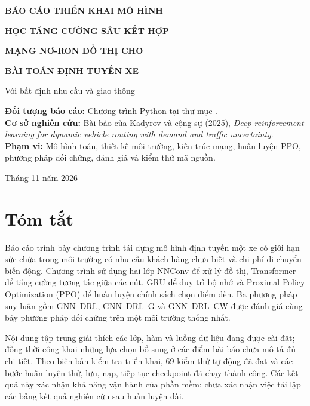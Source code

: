 \documentclass[12pt,a4paper,oneside]{report}
\newcommand{\file}[1]{\texttt{\detokenize{#1}}}
\begin{document}
\begin{titlepage}
\centering
\vspace*{1.5cm}
{\Large\bfseries BÁO CÁO TRIỂN KHAI MÔ HÌNH\par}
\vspace{1.2cm}
{\LARGE\bfseries HỌC TĂNG CƯỜNG SÂU KẾT HỢP\par}
\vspace{0.3cm}
{\LARGE\bfseries MẠNG NƠ-RON ĐỒ THỊ CHO\par}
\vspace{0.3cm}
{\LARGE\bfseries BÀI TOÁN ĐỊNH TUYẾN XE\par}
\vspace{0.6cm}
{\large Với bất định nhu cầu và giao thông\par}
\vspace{1.4cm}
\begin{minipage}{0.9\textwidth}
\textbf{Đối tượng báo cáo:} Chương trình Python tại thư mục
\file{research/cvrp_reproduction}.\\[0.4cm]
\textbf{Cơ sở nghiên cứu:} Bài báo của Kadyrov và cộng sự (2025),
\emph{Deep reinforcement learning for dynamic vehicle routing with demand
and traffic uncertainty}.\\[0.4cm]
\textbf{Phạm vi:} Mô hình toán, thiết kế môi trường, kiến trúc mạng,
huấn luyện PPO, phương pháp đối chứng, đánh giá và kiểm thử mã nguồn.
\end{minipage}
\vfill
{\large Tháng 11 năm 2026\par}
\end{titlepage}

\chapter*{Tóm tắt}
Báo cáo trình bày chương trình tái dựng mô hình định tuyến một xe có giới
hạn sức chứa trong môi trường có nhu cầu khách hàng chưa biết và chi phí
di chuyển biến động. Chương trình sử dụng hai lớp NNConv để xử lý đồ thị,
Transformer để tăng cường tương tác giữa các nút, GRU để duy trì bộ nhớ và
Proximal Policy Optimization (PPO) để huấn luyện chính sách chọn điểm đến.
Ba phương pháp suy luận gồm GNN--DRL, GNN--DRL--G và GNN--DRL--CW được
đánh giá cùng bảy phương pháp đối chứng trên một môi trường thống nhất.

Nội dung tập trung giải thích các lớp, hàm và luồng dữ liệu đang được cài
đặt; đồng thời công khai những lựa chọn bổ sung ở các điểm bài báo chưa
mô tả đủ chi tiết. Theo biên bản kiểm tra triển khai, 69 kiểm thử tự động
đã đạt và các bước huấn luyện thử, lưu, nạp, tiếp tục checkpoint đã chạy
thành công. Các kết quả này xác nhận khả năng vận hành của phần mềm;
chưa xác nhận việc tái lập các bảng kết quả nghiên cứu sau huấn luyện dài.
\end{document}
